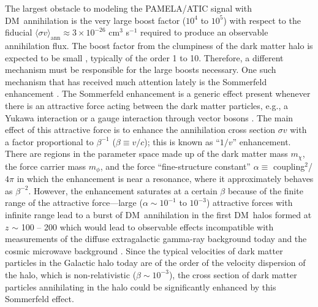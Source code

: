 \documentclass[aps,prd,twocolumn,amsmath,amssymb,floatfix,nofootinbib,10pt]{revtex4}
\newcommand{\eg}{e.g.}
\newcommand{\DM}{DM}
\newcommand{\mdm}{\ensuremath{m_{\chi}}}
\newcommand{\mv}{\ensuremath{m_{\phi}}}
\begin{document}
The largest obstacle to modeling the PAMELA/ATIC signal with \DM\
annihilation is the very large boost factor ($10^4$ to $10^5$) with
respect to the fiducial $\langle \sigma v \rangle_{\mathrm{ann}}
\approx 3 \times 10^{-26} $ cm$^3$ s$^{-1}$ required to produce an
observable annihilation flux. The boost factor from the clumpiness of
the dark matter halo is expected to be small
\cite{2008A&A...479..427L,2008Natur.454..735D,2008ApJ...686..262K,2008Natur.456...73S},
typically of the order 1 to 10. Therefore, a different mechanism must
be responsible for the large boosts necessary. One such mechanism that
has received much attention lately is the Sommerfeld enhancement
\cite{sommerfeld31a,2003PhRvD..67g5014H,2004PhRvL..92c1303H,2005PhRvD..71f3528H,2005PhRvD..71a5007H,2006PhRvD..73e5004H,2008NuPhB.800..204C,2008JHEP...07..058M,2008arXiv0812.0559M,2008arXiv0812.0360L}. The
Sommerfeld enhancement is a generic effect present whenever there is
an attractive force acting between the dark matter particles, \eg, a
Yukawa interaction or a gauge interaction through vector bosons
\cite{ArkaniHamed:2008qn}. The main effect of this attractive force is
to enhance the annihilation cross section $\sigma v$ with a factor
proportional to $\beta^{-1}$ ($\beta \equiv v/c$); this is known as
``$1/v$'' enhancement. There are regions in the parameter space made
up of the dark matter mass \mdm, the force carrier mass \mv, and the
force ``fine-structure constant'' $\alpha \equiv$ coupling$^2$/$4 \pi$
in which the enhancement is near a resonance, where it approximately
behaves as $\beta^{-2}$. However, the enhancement saturates at a
certain $\beta$ because of the finite range of the attractive
force---large ($\alpha \sim\!10^{-1}$ to $10^{-3}$) attractive forces
with infinite range lead to a burst of \DM\ annihilation in the first
\DM\ halos formed at $z$ $\sim$ 100 -- 200 which would lead to
observable effects incompatible with measurements of the diffuse
extragalactic gamma-ray background today and the cosmic microwave
background \cite{2008arXiv0810.3233K}. Since the typical velocities of
dark matter particles in the Galactic halo today are of the order of
the velocity dispersion of the halo, which is non-relativistic
($\beta\sim 10^{-3}$), the cross section of dark matter particles
annihilating in the halo could be significantly enhanced by this
Sommerfeld effect.
\end{document}

